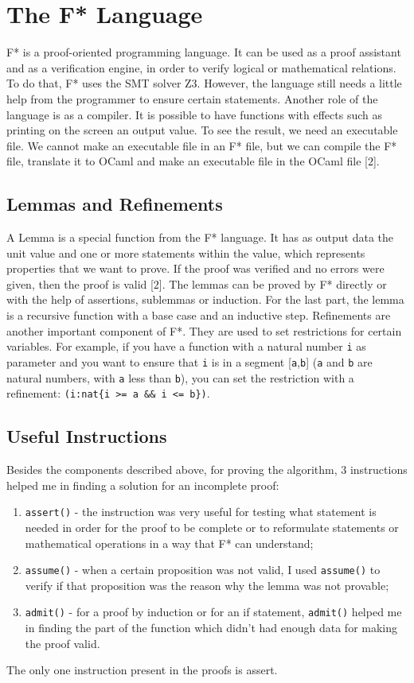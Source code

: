 \chapter{The F* Language}

F* is a proof-oriented programming language. It can be used as a proof assistant and as a verification engine, in order to verify logical or mathematical relations. To do that, F* uses the SMT solver Z\(3\). However, the language still needs a little help from the programmer to ensure certain statements. Another role of the language is as a compiler. It is possible to have functions with effects such as printing on the screen an output value. To see the result, we need an executable file. We cannot make an executable file in an F* file, but we can compile the F* file, translate it to OCaml and make an executable file in the OCaml file [\(2\)].

\section{Lemmas and Refinements}

A Lemma is a special function from the F* language. It has as output data the unit value and one or more statements within the value, which represents properties that we want to prove. If the proof was verified and no errors were given, then the proof is valid [\(2\)]. The lemmas can be proved by F* directly or with the help of assertions, sublemmas or induction. For the last part, the lemma is a recursive function with a base case and an inductive step. Refinements are another important component of F*. They are used to set restrictions for certain variables. For example, if you have a function with a natural number \texttt{i} as parameter and you want to ensure that \texttt{i} is in a segment [\texttt{a},\texttt{b}] (\texttt{a} and \texttt{b} are natural numbers, with \texttt{a} less than \texttt{b}), you can set the restriction with a refinement: \texttt{(i:nat\{i >= a \&\& i <= b\})}.

\section{Useful Instructions}

Besides the components described above, for proving the algorithm, \(3\) instructions helped me in finding a solution for an incomplete proof:
\begin{enumerate}
\item \texttt{assert()} - the instruction was very useful for testing what statement is needed in order for the proof to be complete or to reformulate statements or mathematical operations in a way that F* can understand;
\item \texttt{assume()} - when a certain proposition was not valid, I used \texttt{assume()} to verify if that proposition was the reason why the lemma was not provable;
\item \texttt{admit()} - for a proof by induction or for an if statement, \texttt{admit()} helped me in finding the part of the function which didn't had enough data for making the proof valid.
\end{enumerate}

The only one instruction present in the proofs is assert.